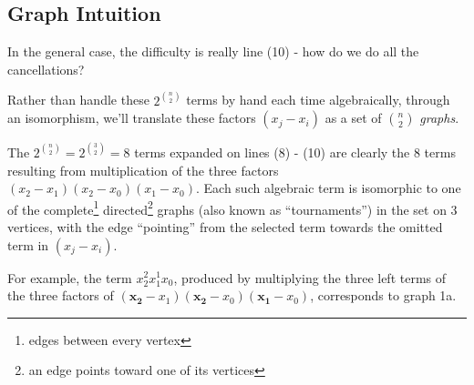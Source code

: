 \documentclass[11pt, oneside]{article} 	%
\begin{document}
\subsection{Graph Intuition}

In the general case, the difficulty is really line (10) - how do we do all the cancellations?

Rather than handle these $2^{n \choose 2}$ terms by hand each time algebraically, through an isomorphism, we'll translate these factors $(x_j - x_i)$ as a set of ${n \choose 2}$ \emph{graphs}.

The $2^{n \choose 2} = 2^{3 \choose 2} = 8$ terms expanded on lines (8) - (10) are clearly the 8 terms resulting from multiplication of the three factors $(x_2 - x_1)(x_2-x_0)(x_1-x_0)$.  Each such algebraic term is isomorphic to one of the complete\footnote{edges between every vertex} directed\footnote{an edge points toward one of its vertices} graphs (also known as ``tournaments'') in the set on 3 vertices, with the edge ``pointing'' from the selected term towards the omitted term in $(x_j - x_i)$.

For example, the term $x_2^2x_1^1x_0$, produced by multiplying the three left terms of the three factors of $(\mathbf{x_2}-x_1)(\mathbf{x_2}-x_0)(\mathbf{x_1}-x_0)$, corresponds to graph 1a.  
\end{document}
